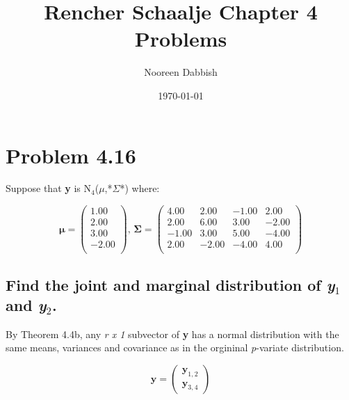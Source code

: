 \documentclass[11pt]{article}
\title{Rencher Schaalje Chapter 4 Problems}
\author{Nooreen Dabbish}
\date{\today}
\begin{document}
\maketitle

\setcounter{tocdepth}{3}
\tableofcontents
\vspace*{1cm}
\section{Problem 4.16}
\label{sec-1}

Suppose that \textbf{y} is N$_4$(\textbf{$\mu$},*$\Sigma$*) where:



$$\mathbf{\mu} = 
\begin{pmatrix}
  1.00 \\  
  2.00 \\  
  3.00 \\  
  -2.00  \\ 
  \end{pmatrix},\,
\mathbf{\Sigma} = 
\begin{pmatrix}
  4.00 & 2.00 & -1.00 & 2.00  \\ 
  2.00 & 6.00 & 3.00 & -2.00  \\ 
  -1.00 & 3.00 & 5.00 & -4.00  \\ 
  2.00 & -2.00 & -4.00 & 4.00  \\ 
  \end{pmatrix}$$
\subsection{Find the joint and marginal distribution of \emph{y$_1$} and \emph{y$_2$}.}
\label{sec-1-1}


By Theorem 4.4b, any \emph{r x 1} subvector of \textbf{y} has a normal
distribution with the same means, variances and covariance as in the
orgininal \emph{p}-variate distribution.


$$ \mathbf{y} = \begin{pmatrix}\mathbf{y}_{1,2} \\ \mathbf{y}_{3,4} \end{pmatrix}$$
\end{document}
